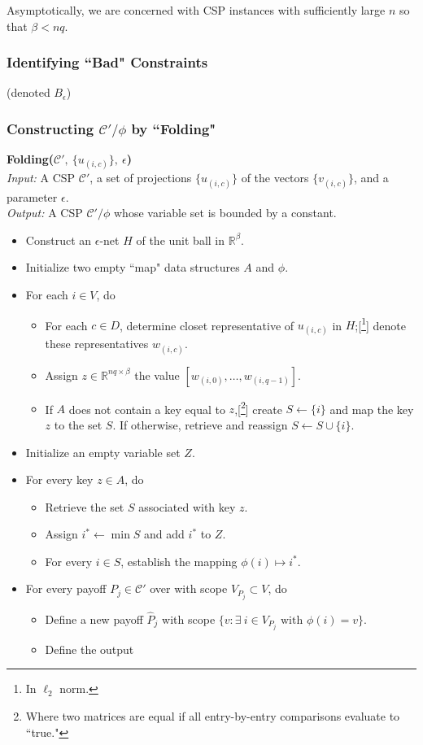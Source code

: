 \documentclass[letterpaper, 12pt]{article}
\numberwithin{equation}{section}
\begin{document}
Asymptotically, we are concerned with CSP instances with sufficiently large $n$ so that $\beta < nq$.
\subsubsection{Identifying ``Bad" Constraints}
(denoted $B_{\epsilon}$)
\subsubsection{Constructing $\mathcal{C}'/\phi$ by ``Folding"}
\begin{algorithm} \textbf{ Folding($\mathcal{C}',~\{u_{(i,c)}\}, ~\epsilon$)} \\

\textit{Input: } A CSP $\mathcal{C}'$, a set of projections $\{u_{(i,c)}\}$ of the vectors $\{v_{(i,c)}\}$, and a parameter $\epsilon$. \\

\textit{Output: } A CSP $\mathcal{C}'/\phi$ whose variable set is bounded by a constant.

\begin{itemize}
\item Construct an $\epsilon$-net $H$ of the unit ball in $\mathbb{R}^\beta$.
\item Initialize two empty ``map" data structures $A$ and $\phi$.
\item For each $i \in V$, do
	\begin{itemize}
	\item For each $c \in D$, determine closet representative of $u_{(i,c)}$ in $H$;[\footnote{In $\ell_2$ norm.}] 
		denote these representatives $w_{(i,c)}$. 
	\item Assign $z \in \mathbb{R}^{nq \times \beta}$ the value $ [w_{(i,0)},  \ldots, w_{(i,q-1)}]$.
	\item If $A$ does not contain a key equal to $z$,[\footnote{Where two matrices are equal if all entry-by-entry comparisons evaluate to ``true."}] create $S \leftarrow \{i\}$ and map the key $z$ to the set $S$. 
		If otherwise, retrieve and reassign $S \leftarrow S\cup\{i\}$.
	\end{itemize}
\item Initialize an empty variable set $Z$.
\item For every key $z \in A$, do
	\begin{itemize}
	\item Retrieve the set $S$ associated with key $z$. 
	\item Assign $i^* \leftarrow \min S$ and add $i^*$ to $Z$.
	\item For every $i \in S$, establish the mapping $\phi(i) \mapsto i^*$.
	\end{itemize}
\item For every payoff $P_j \in \mathcal{C}'$ over with scope $V_{P_j} \subset V$, do
	\begin{itemize}
	\item Define a new payoff $\hat{P}_j$ with scope $\{v : \exists ~ i \in V_{P_j}\text{ with } \phi(i) = v \}$.
	\item Define the output 
	\end{itemize}
\end{itemize}


\end{algorithm}
\end{document}
